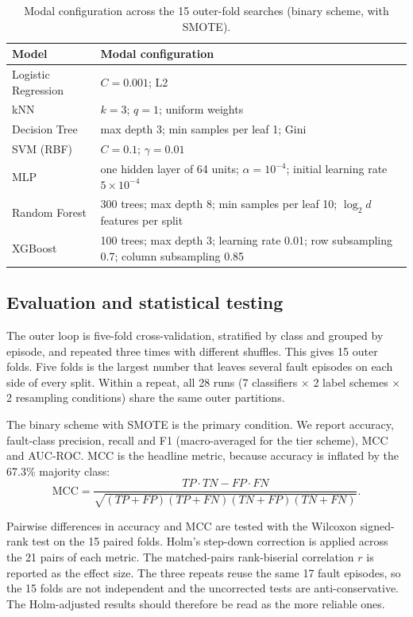 \documentclass[11pt,a4paper]{article}
\begin{document}
\begin{table}[t]
\centering
\caption{Modal configuration across the 15 outer-fold searches (binary scheme, with SMOTE).}
\label{tab:modal}
\small
\begin{tabularx}{\textwidth}{@{}lY@{}}
\toprule
Model & Modal configuration \\
\midrule
Logistic Regression & $C=0.001$; L2 \\
kNN & $k=3$; $q=1$; uniform weights \\
Decision Tree & max depth 3; min samples per leaf 1; Gini \\
SVM (RBF) & $C=0.1$; $\gamma=0.01$ \\
MLP & one hidden layer of 64 units; $\alpha=10^{-4}$; initial learning rate $5\times10^{-4}$ \\
Random Forest & 300 trees; max depth 8; min samples per leaf 10; $\log_2 d$ features per split \\
XGBoost & 100 trees; max depth 3; learning rate 0.01; row subsampling 0.7; column subsampling 0.85 \\
\bottomrule
\end{tabularx}
\end{table}

\subsection{Evaluation and statistical testing}

The outer loop is five-fold cross-validation, stratified by class and grouped by episode, and repeated three times with different shuffles. This gives 15 outer folds. Five folds is the largest number that leaves several fault episodes on each side of every split. Within a repeat, all 28 runs (7 classifiers $\times$ 2 label schemes $\times$ 2 resampling conditions) share the same outer partitions.

The binary scheme with SMOTE is the primary condition. We report accuracy, fault-class precision, recall and F1 (macro-averaged for the tier scheme), MCC and AUC-ROC. MCC is the headline metric, because accuracy is inflated by the 67.3\% majority class:
\begin{equation}
\mathrm{MCC}=\frac{TP\cdot TN-FP\cdot FN}{\sqrt{(TP+FP)(TP+FN)(TN+FP)(TN+FN)}}.
\end{equation}

Pairwise differences in accuracy and MCC are tested with the Wilcoxon signed-rank test on the 15 paired folds. Holm's step-down correction is applied across the 21 pairs of each metric. The matched-pairs rank-biserial correlation $r$ \citep{Kerby2014} is reported as the effect size. The three repeats reuse the same 17 fault episodes, so the 15 folds are not independent and the uncorrected tests are anti-conservative. The Holm-adjusted results should therefore be read as the more reliable ones.
\end{document}
